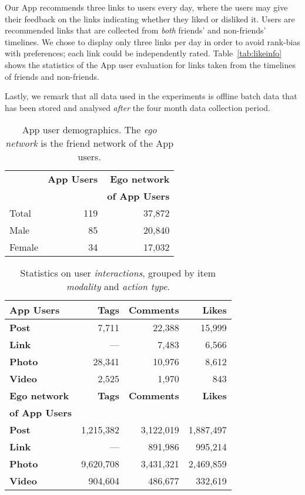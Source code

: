 Our App recommends three links to users every day, where the users may
give their feedback on the links indicating whether they liked or
disliked it. Users are recommended links that are collected
from \emph{both} friends' and non-friends' timelines.  We chose to 
display only three links per day in order to avoid rank-bias with
preferences; each link could be independently rated.
Table~\ref{tab:likeinfo}
shows the statistics of the App user evaluation for links taken from the
timelines of friends and non-friends.  

Lastly, we remark that all data used in the experiments is offline
batch data that has been stored and analysed \emph{after} the four
month data collection period.
      							
\begin{table}[t!]
\centering
\begin{tabular}{|>{\small}l|>{\small}r|>{\small}r|}
\hline
& \textbf{App Users} & \textbf{Ego network} \\
& & \textbf{of App Users} \\
\hline
Total & 119 & 37,872 \\
\hline \hline
Male & 85 & 20,840 \\
\hline
Female & 34 & 17,032 \\
\hline
\end{tabular}
\caption{App user demographics.  The \emph{ego network} is the friend
network of the App users.}
\label{tab:demographics}
\end{table}

\begin{table}[t!]
\centering
\begin{tabular}{|>{\small}l|>{\small}r|>{\small}r|>{\small}r|}
\hline
\textbf{App Users} & \textbf{Tags} & \textbf{Comments} & \textbf{Likes} \\
\hline
\textbf{Post} & 7,711 & 22,388 & 15,999 \\
\hline
\textbf{Link}  & --- & 7,483 & 6,566 \\
\hline
\textbf{Photo} & 28,341 & 10,976 & 8,612 \\
\hline
\textbf{Video} & 2,525 & 1,970 & 843 \\
\hline
\hline
\textbf{Ego network} & \textbf{Tags} & \textbf{Comments} & \textbf{Likes} \\
\textbf{of App Users}  & & & \\
\hline
\textbf{Post} & 1,215,382 & 3,122,019 & 1,887,497 \\
\hline
\textbf{Link} & --- & 891,986 & 995,214 \\
\hline
\textbf{Photo} & 9,620,708 & 3,431,321 & 2,469,859 \\
\hline
\textbf{Video} & 904,604 & 486,677 & 332,619 \\
\hline
\end{tabular}
\caption{Statistics on user {\em interactions}, grouped by item {\em modality} and {\em action type}.}
\label{tab:interactions}
\end{table}


